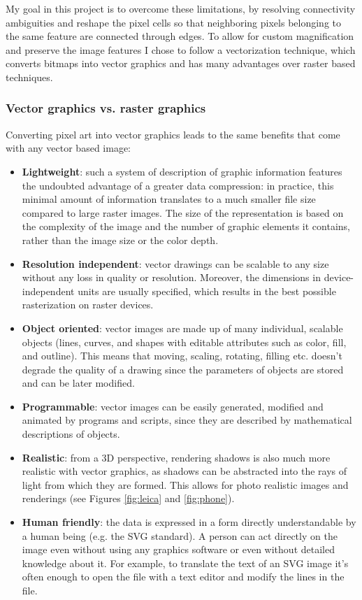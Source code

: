 \documentclass[]{usiinfbachelorproject}
\begin{document}
My goal in this project is to overcome these limitations, by resolving connectivity ambiguities and reshape the pixel cells so that neighboring pixels belonging to the same feature are connected through edges. To allow for custom magnification and preserve the image features I chose to follow a vectorization technique, which converts bitmaps into vector graphics and has many advantages over raster based techniques.


\subsubsection{Vector graphics vs. raster graphics}

Converting pixel art into vector graphics leads to the same benefits that come with any vector based image:
\begin{itemize}
	\item \textbf{Lightweight}: such a system of description of graphic information features the undoubted advantage of a greater data compression: in practice, this minimal amount of information translates to a much smaller file size compared to large raster images. The size of the representation is based on the complexity of the image and the number of graphic elements it contains, rather than the image size or the color depth. 
	\item \textbf{Resolution independent}: vector drawings can be scalable to any size without any loss in quality or resolution. Moreover, the dimensions in device-independent units are usually specified, which results in the best possible rasterization on raster devices.
	\item \textbf{Object oriented}: vector images are made up of many individual, scalable objects (lines, curves, and shapes with editable attributes such as color, fill, and outline). This means that moving, scaling, rotating, filling etc. doesn't degrade the quality of a drawing since the parameters of objects are stored and can be later modified.
	\item \textbf{Programmable}: vector images can be easily generated, modified and animated by programs and scripts, since they are described by mathematical descriptions of objects.
	\item \textbf{Realistic}: from a 3D perspective, rendering shadows is also much more realistic with vector graphics, as shadows can be abstracted into the rays of light from which they are formed. This allows for photo realistic images and renderings (see Figures \ref{fig:leica} and \ref{fig:phone}).
	\item \textbf{Human friendly}: the data is expressed in a form directly understandable by a human being (e.g. the SVG standard). A person can act directly on the image even without using any graphics software or even without detailed knowledge about it. For example, to translate the text of an SVG image it's often enough to open the file with a text editor and modify the lines in the file.
\end{itemize}
\end{document}
